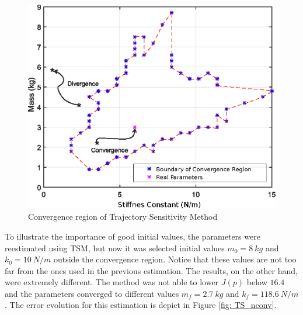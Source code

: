\begin{figure}[h]
	\caption{Convergence region of Trajectory Sensitivity Method}
	\begin{center}
		\includegraphics[scale=0.6]{Images/Conv_reg.eps}
	\end{center}
	\label{fig: conv_reg}
\end{figure}

To illustrate the importance of good initial values, the parameters were reestimated using TSM, but now it was selected initial values $m_{0} = 8\ kg$ and $k_{0} = 10\ N/m$ outside the convergence region. Notice that these values are not too far from the ones used in the previous estimation. The results, on the other hand, were extremely different. The method was not able to lower $J(p)$ below $16.4$ and the parameters converged to different values $m_{f} = 2.7\ kg$ and $k_{f} = 118.6\ N/m$. The error evolution for this estimation is depict in Figure \ref{fig: TS_nconv}.

